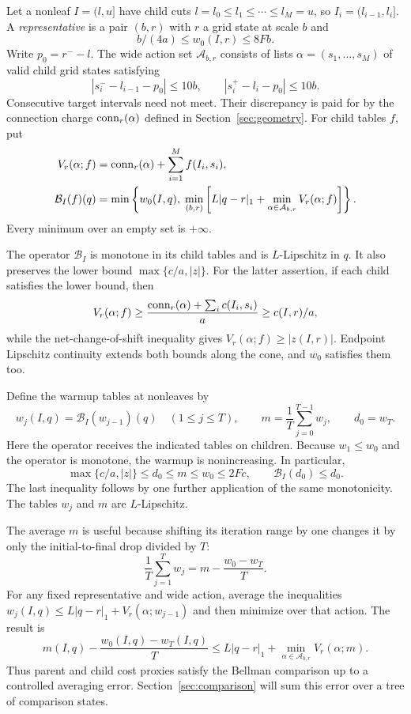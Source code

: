 Let a nonleaf $I=(l,u]$ have child cuts
$l=l_0\le l_1\le\cdots\le l_M=u$, so
$I_i=(l_{i-1},l_i]$.  A \emph{representative} is a pair $(b,r)$ with
$r$ a grid state at scale $b$ and
\begin{equation}\label{eq:representative}
 b/(4a)\le w_0(I,r)\le8Fb.
\end{equation}
Write $p_0=r^--l$.  The wide action set $\mathcal A_{b,r}$ consists of
lists $\alpha=(s_1,\ldots,s_M)$ of valid child grid states satisfying
\[
 |s_i^--l_{i-1}-p_0|\le10b,
 \qquad |s_i^+-l_i-p_0|\le10b.
\]
Consecutive target intervals need not meet.  Their discrepancy is paid
for by the connection charge $\operatorname{conn}_r(\alpha)$ defined in
Section~\ref{sec:geometry}.  For child tables $f$, put
\begin{align}
 V_r(\alpha;f)&=\operatorname{conn}_r(\alpha)+\sum_{i=1}^M f(I_i,s_i),
 \label{eq:action-cost}\\
 \mathcal B_I(f)(q)
 &=\min\left\{w_0(I,q),\;
 \min_{(b,r)}\left[L|q-r|_1+
        \min_{\alpha\in\mathcal A_{b,r}}V_r(\alpha;f)\right]\right\}.
 \label{eq:bellman}
\end{align}
Every minimum over an empty set is $+\infty$.

The operator $\mathcal B_I$ is monotone in its child tables and is
$L$-Lipschitz in $q$.  It also preserves the lower bound
$\max\{c/a,|z|\}$.  For the latter assertion, if each child satisfies
the lower bound, then
\[
 V_r(\alpha;f)
 \ge\frac{\operatorname{conn}_r(\alpha)+\sum_i c(I_i,s_i)}a
 \ge c(I,r)/a,
\]
while the net-change-of-shift inequality gives
$V_r(\alpha;f)\ge|z(I,r)|$.  Endpoint Lipschitz continuity extends
both bounds along the cone, and $w_0$ satisfies them too.

Define the warmup tables at nonleaves by
\begin{equation}\label{eq:warmup}
 w_j(I,q)=\mathcal B_I(w_{j-1})(q)\quad(1\le j\le T),
 \qquad
 m=\frac1T\sum_{j=0}^{T-1}w_j,\qquad d_0=w_T.
\end{equation}
Here the operator receives the indicated tables on children.  Because
$w_1\le w_0$ and the operator is monotone, the warmup is nonincreasing.
In particular,
\begin{equation}\label{eq:warmup-invariants}
 \max\{c/a,|z|\}\le d_0\le m\le w_0\le2Fc,
 \qquad \mathcal B_I(d_0)\le d_0.
\end{equation}
The last inequality follows by one further application of the same
monotonicity.  The tables $w_j$ and $m$ are $L$-Lipschitz.

The average $m$ is useful because shifting its iteration range by one
changes it by only the initial-to-final drop divided by $T$:
\[
 \frac1T\sum_{j=1}^T w_j
 =m-\frac{w_0-w_T}{T}.
\]
For any fixed representative and wide action, average the inequalities
$w_j(I,q)\le L|q-r|_1+V_r(\alpha;w_{j-1})$ and then minimize over
that action. The result is
\[
 m(I,q)-\frac{w_0(I,q)-w_T(I,q)}T
 \le L|q-r|_1+\min_{\alpha\in\mathcal A_{b,r}}V_r(\alpha;m).
\]
Thus parent and child cost proxies satisfy the Bellman comparison up to
a controlled averaging error. Section~\ref{sec:comparison} will sum this
error over a tree of comparison states.

